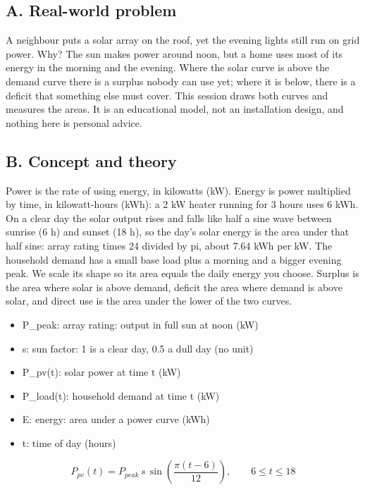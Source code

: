 \documentclass[11pt,a4paper]{article}
\begin{document}
\subsection*{A. Real-world problem}
A neighbour puts a solar array on the roof, yet the evening lights still run on grid power. Why? The sun makes power around noon, but a home uses most of its energy in the morning and the evening. Where the solar curve is above the demand curve there is a surplus nobody can use yet; where it is below, there is a deficit that something else must cover. This session draws both curves and measures the areas. It is an educational model, not an installation design, and nothing here is personal advice.

\subsection*{B. Concept and theory}
Power is the rate of using energy, in kilowatts (kW). Energy is power multiplied by time, in kilowatt-hours (kWh): a 2 kW heater running for 3 hours uses 6 kWh. On a clear day the solar output rises and falls like half a sine wave between sunrise (6 h) and sunset (18 h), so the day's solar energy is the area under that half sine: array rating times 24 divided by pi, about 7.64 kWh per kW. The household demand has a small base load plus a morning and a bigger evening peak. We scale its shape so its area equals the daily energy you choose. Surplus is the area where solar is above demand, deficit the area where demand is above solar, and direct use is the area under the lower of the two curves.

\begin{itemize}[nosep]
\item P\_peak: array rating: output in full sun at noon (kW)
\item s: sun factor: 1 is a clear day, 0.5 a dull day (no unit)
\item P\_pv(t): solar power at time t (kW)
\item P\_load(t): household demand at time t (kW)
\item E: energy: area under a power curve (kWh)
\item t: time of day (hours)
\end{itemize}

\begin{equation*}
P_{pv}(t)=P_{peak}\,s\,\sin\!\left(\frac{\pi (t-6)}{12}\right),\qquad 6\le t\le 18
\end{equation*}
\end{document}
